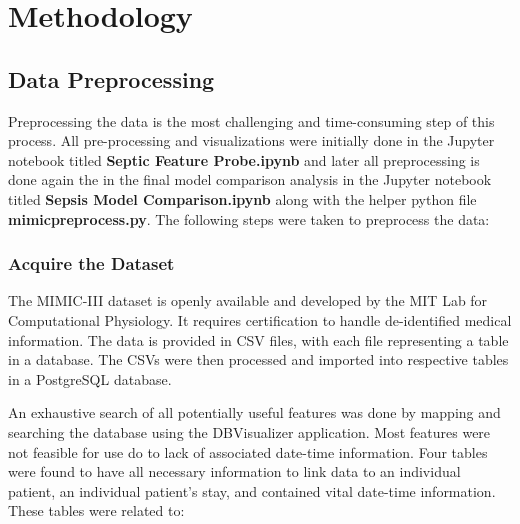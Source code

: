 \documentclass[11pt]{article}
\begin{document}
	\section{Methodology}
	\subsection{Data Preprocessing}
	Preprocessing the data is the most challenging and time-consuming step of this process. All pre-processing and visualizations were initially done in the Jupyter notebook titled \textbf{Septic Feature Probe.ipynb} and later all preprocessing is done again the in the final model comparison analysis in the Jupyter notebook titled \textbf{Sepsis Model Comparison.ipynb} along with the helper python file \textbf{mimicpreprocess.py}. The following steps were taken to preprocess the data:
	
		\subsubsection{Acquire the Dataset}
		The MIMIC-III dataset is openly available and developed by the MIT Lab for Computational Physiology. It requires certification to handle de-identified medical information. The data is provided in CSV files, with each file representing a table in a database. The CSVs were then processed and imported into respective tables in a PostgreSQL database.
		
		An exhaustive search of all potentially useful features was done by mapping and searching the database using the DBVisualizer application. Most features were not feasible for use do to lack of associated date-time information. Four tables were found to have all necessary information to link data to an individual patient, an individual patient's stay, and contained vital date-time information. These tables were related to:
		
\end{document}
